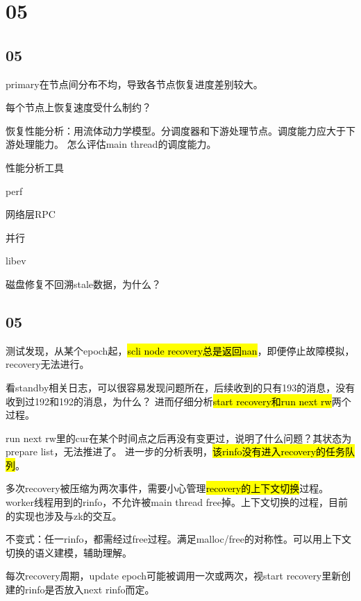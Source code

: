 \section{05}

\subsection{05}

primary在节点间分布不均，导致各节点恢复进度差别较大。

每个节点上恢复速度受什么制约？

恢复性能分析：用流体动力学模型。分调度器和下游处理节点。调度能力应大于下游处理能力。
怎么评估main thread的调度能力。

性能分析工具
\begin{enumbox}
\item perf
\end{enumbox}

网络层RPC
\begin{enumbox}
\item 并行
\item libev
\end{enumbox}

磁盘修复不回溯stale数据，为什么？

\subsection{05}

测试发现，从某个epoch起，\hl{scli node recovery总是返回nan}，即便停止故障模拟，recovery无法进行。

看standby相关日志，可以很容易发现问题所在，后续收到的只有193的消息，没有收到过192和192的消息，为什么？
进而仔细分析\hl{start recovery和run next rw}两个过程。

run next rw里的cur在某个时间点之后再没有变更过，说明了什么问题？其状态为prepare list，无法推进了。
进一步的分析表明，\hl{该rinfo没有进入recovery的任务队列}。

多次recovery被压缩为两次事件，需要小心管理\hl{recovery的上下文切换}过程。
worker线程用到的rinfo，不允许被main thread free掉。上下文切换的过程，目前的实现也涉及与zk的交互。

不变式：任一rinfo，都需经过free过程。满足malloc/free的对称性。可以用上下文切换的语义建模，辅助理解。

每次recovery周期，update epoch可能被调用一次或两次，视start recovery里新创建的rinfo是否放入next rinfo而定。

\hrulefill

